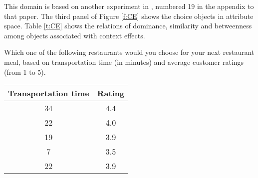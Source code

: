 
This domain is based on another experiment in , numbered 19 in the appendix to that paper.
The third panel of Figure \ref{f:CE} shows the choice objects in attribute space.
Table \ref{t:CE} shows the relations of dominance, similarity and betweenness among objects associated with context effects.

\begin{tcolorbox}
Which one of the following restaurants would you choose for your next restaurant meal, based on transportation time (in minutes) and average customer ratings (from
1 to 5).
	
\begin{tabular}{cc}
\hline
Transportation time & Rating \\ \hline
34 & 4.4 \\ 
22 & 4.0 \\ 
19 & 3.9 \\ 
7 & 3.5 \\ 
22 & 3.9 \\ \hline
\end{tabular}
\end{tcolorbox}
